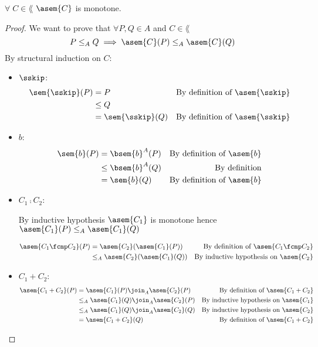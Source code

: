 \begin{theorem}[Monotonicity]
  \label{thm:asem-mono} 
  $\forall \; C \in \lang$ $\asem{C}$ is monotone.
\end{theorem}
\begin{proof}
  We want to prove that $\forall P, Q \in A$ and $C \in \lang$
  $$P \leq_A Q \implies \asem{C}(P) \leq_A \asem{C}(Q)$$
  By structural induction on $C$:
  \begin{itemize}
    \item $\sskip$:
      \begin{align*}
        \sem{\sskip}(P) 
          &= P & \text{By definition of $\asem{\sskip}$}\\
          &\leq Q \\
          &= \sem{\sskip}(Q) & \text{By definition of $\asem{\sskip}$}\\
      \end{align*}

    \item $b$:
      \begin{align*}
        \sem{b}(P) 
          &= \bsem{b}^A(P)
          & \text{By definition of $\asem{b}$}\\
          &\leq \bsem{b}^A(Q)
          & \text{By definition}\\
          &= \sem{b}(Q) & \text{By definition of $\asem{b}$}\\
      \end{align*}

    \item $C_1 \fcmp C_2$:

      By inductive hypothesis $\asem{C_1}$ is monotone hence
      $\asem{C_1}(P) \leq_A \asem{C_1}(Q)$

      \begin{align*}
        \asem{C_1 \fcmp C_2}(P) 
          &= \asem{C_2}(\asem{C_1}(P))
          &\text{By definition of $\asem{C_1 \fcmp C_2}$}\\
          &\leq_A \asem{C_2}(\asem{C_1}(Q))
          &\text{By inductive hypothesis on $\asem{C_2}$} \\
      \end{align*}
  
    \item $C_1 + C_2$:
      \begin{align*}
        \asem{C_1 + C_2}(P) 
          &= \asem{C_1}(P) \join_A \asem{C_2}(P)
          &\text{By definition of $\asem{C_1 + C_2}$}\\
          &\leq_A \asem{C_1}(Q) \join_A \asem{C_2}(P)
          &\text{By inductive hypothesis on $\asem{C_1}$} \\
          &\leq_A \asem{C_1}(Q) \join_A \asem{C_2}(Q)
          &\text{By inductive hypothesis on $\asem{C_2}$} \\
          &= \asem{C_1 + C_2}(Q) 
          &\text{By definition of $\asem{C_1 + C_2}$}\\
      \end{align*}
    

\end{itemize}
\end{proof}
